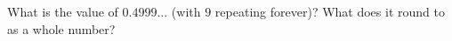 What is the value of $0.4999\ldots$ (with $9$ repeating forever)? What does it round to as a whole number?
